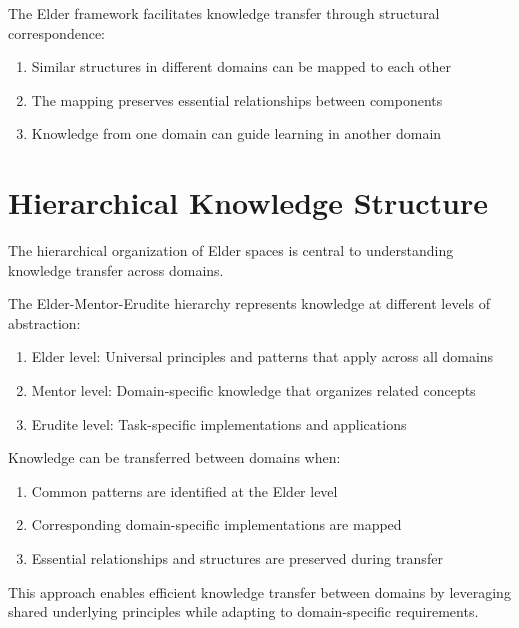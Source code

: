 \begin{theorem}
The Elder framework facilitates knowledge transfer through structural correspondence:
\begin{enumerate}
    \item Similar structures in different domains can be mapped to each other
    \item The mapping preserves essential relationships between components
    \item Knowledge from one domain can guide learning in another domain
\end{enumerate}
\end{theorem}

\section{Hierarchical Knowledge Structure}

The hierarchical organization of Elder spaces is central to understanding knowledge transfer across domains.

\begin{theorem}
The Elder-Mentor-Erudite hierarchy represents knowledge at different levels of abstraction:
\begin{enumerate}
    \item Elder level: Universal principles and patterns that apply across all domains
    \item Mentor level: Domain-specific knowledge that organizes related concepts
    \item Erudite level: Task-specific implementations and applications
\end{enumerate}
\end{theorem}

\begin{corollary}
Knowledge can be transferred between domains when:
\begin{enumerate}
    \item Common patterns are identified at the Elder level
    \item Corresponding domain-specific implementations are mapped
    \item Essential relationships and structures are preserved during transfer
\end{enumerate}
\end{corollary}

This approach enables efficient knowledge transfer between domains by leveraging shared underlying principles while adapting to domain-specific requirements.

